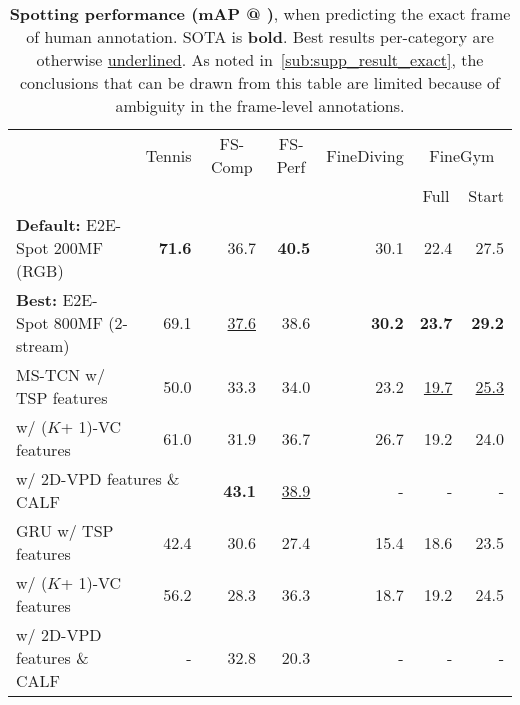 \documentclass[runningheads]{llncs}
\newcommand{\notation}[1]{\ensuremath{#1}\xspace}
\newcommand{\OURMETHOD}{{E2E-Spot}\xspace}
\newcommand{\fscomp}{{FS-Comp}\xspace}
\newcommand{\fsperf}{{FS-Perf}\xspace}
\newcommand{\tennis}{{Tennis}\xspace}
\newcommand{\finegym}{{FineGym}\xspace}
\newcommand{\finediving}{{FineDiving}\xspace}
\newcommand{\NumClasses}{\notation{K}}
\newcommand{\best}[1]{\underline{#1}}
\newcommand{\sota}[1]{\textbf{#1}}
\begin{document}
\renewcommand{\tabcolsep}{0.12cm}
\begin{table*}[p]
    \centering
    \caption{{\bf Spotting performance (mAP @ )}, when predicting the exact frame of human annotation.
SOTA is \sota{bold}. Best results per-category are otherwise \best{underlined}.
As noted in~\autoref{sub:supp_result_exact}, the conclusions that can be drawn from this table are limited because of ambiguity in the frame-level annotations. }
    \label{tab:supp_result_exact}
    {
    \scriptsize
    \begin{tabularx}{\textwidth}{lrrrrrr}
        \toprule
            & \multicolumn{1}{c}{\tennis}
            & \multicolumn{1}{c}{\fscomp}
            & \multicolumn{1}{c}{\fsperf}
            & \multicolumn{1}{c}{\finediving}
            & \multicolumn{2}{c}{\finegym}
            \\
            &
            &
            &
            &
            & \multicolumn{1}{c}{Full}
            & \multicolumn{1}{c}{Start}
            \\
        \midrule
        {\bf Default:} \OURMETHOD 200MF (RGB)
            & \sota{71.6}
            & 36.7
            & \sota{40.5}
            & 30.1
            & 22.4 & 27.5 \\
        {\bf Best:} \OURMETHOD 800MF (2-stream)
            & 69.1
            & \best{37.6}
            & 38.6
            & \sota{30.2}
            & \sota{23.7} & \sota{29.2} \\
        \midrule
        MS-TCN w/ TSP features
            & 50.0
            & 33.3
            & 34.0
            & 23.2
            & \best{19.7} & \best{25.3}\\
        \hspace{4em} w/ (\NumClasses + 1)-VC features
            & 61.0
            & 31.9
            & 36.7
            & 26.7
            & 19.2 & 24.0 \\
        \multicolumn{2}{l}{\hspace{4em} w/ 2D-VPD features \& CALF}
            - & \sota{43.1} & \best{38.9} & - & - & - \\

        GRU w/ TSP features
            & 42.4
            & 30.6
            & 27.4
            & 15.4
            & 18.6 & 23.5 \\
        \hspace{2.2em} w/ (\NumClasses + 1)-VC features
            & 56.2
            & 28.3
            & 36.3
            & 18.7
            & 19.2 & 24.5 \\
        \hspace{2.2em} w/ 2D-VPD features \& CALF
            & - & 32.8 & 20.3 & - & - & - \\


\end{tabularx}}
\end{table*}
\end{document}
